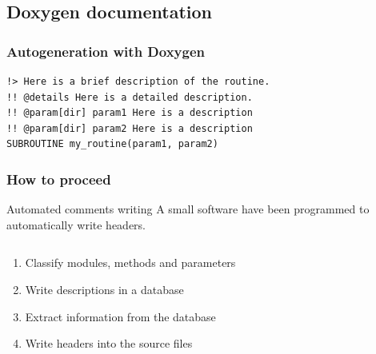 \documentclass[10p]{beamer}
\begin{document}
\subsection{Doxygen documentation}
\begin{frame}[fragile]
\frametitle{Autogeneration with Doxygen}



\begin{example}
\begin{lstlisting}
!> Here is a brief description of the routine.
!! @details Here is a detailed description.
!! @param[dir] param1 Here is a description
!! @param[dir] param2 Here is a description
SUBROUTINE my_routine(param1, param2)
\end{lstlisting}
\end{example}
\end{frame}

\begin{frame}
\frametitle{How to proceed}
\begin{block}{Automated comments writing}
A small software have been programmed to automatically write headers.
\end{block}

\begin{columns}
\begin{column}{0.4\textwidth}
\begin{enumerate}
\item Classify modules, methods and parameters
\item Write descriptions in a database
\item Extract information from the database
\item Write headers into the source files
\end{enumerate}
\end{column}
\begin{column}{0.6\textwidth}
\end{column}
\end{columns}
\end{frame}
\end{document}
